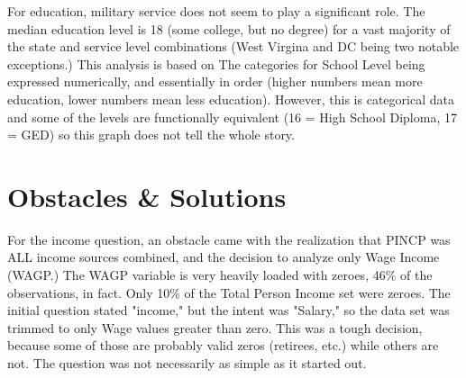 \documentclass{article}
\begin{document}
For education, military service does not seem to play a significant role. The median education level is 18 (some college, but no degree) for a vast majority of the state and service level combinations (West Virgina and DC being two notable exceptions.) This analysis is based on The categories for School Level being expressed numerically, and essentially in order (higher numbers mean more education, lower numbers mean less education). However, this is categorical data and some of the levels are functionally equivalent (16 = High School Diploma, 17 = GED) so this graph does not tell the whole story.
\begin{figure}[h!]
\begin{floatrow}
\end{floatrow}
\end{figure}



\section{Obstacles \& Solutions}
For the income question, an obstacle came with the realization that PINCP was ALL income sources combined, and the decision to analyze only Wage Income (WAGP.) The WAGP variable is very heavily loaded with zeroes, 46\% of the observations, in fact. Only 10\% of the Total Person Income set were zeroes. The initial question stated "income," but the intent was "Salary," so the data set was trimmed to only Wage values greater than zero. This was a tough decision, because some of those are probably valid zeros (retirees, etc.) while others are not. The question was not necessarily as simple as it started out. 
\end{document}
